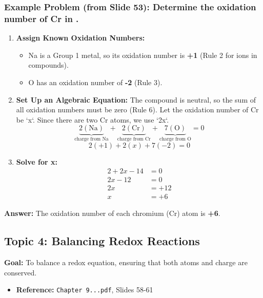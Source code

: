 \documentclass{article}
\begin{document}
\subsubsection*{Example Problem (from Slide 53): Determine the oxidation number of Cr in .}
\begin{enumerate}[label=\textbf{Step \arabic*:}, itemsep=5pt]
    \item \textbf{Assign Known Oxidation Numbers:}
    \begin{itemize}
        \item Na is a Group 1 metal, so its oxidation number is \textbf{+1} (Rule 2 for ions in compounds).
        \item O has an oxidation number of \textbf{-2} (Rule 3).
    \end{itemize}
    \item \textbf{Set Up an Algebraic Equation:} The compound is neutral, so the sum of all oxidation numbers must be zero (Rule 6). Let the oxidation number of Cr be `x`. Since there are two Cr atoms, we use `2x`.
    \[ \underbrace{2(\text{Na})}_{\text{charge from Na}} + \underbrace{2(\text{Cr})}_{\text{charge from Cr}} + \underbrace{7(\text{O})}_{\text{charge from O}} = 0 \]
    \[ 2(+1) + 2(x) + 7(-2) = 0 \]
    \item \textbf{Solve for x:}
    \begin{align*}
        2 + 2x - 14 &= 0 \\
        2x - 12 &= 0 \\
        2x &= +12 \\
        x &= +6
    \end{align*}
\end{enumerate}
\textbf{Answer:} The oxidation number of each chromium (Cr) atom is \textbf{+6}.

\subsection*{Topic 4: Balancing Redox Reactions}
\textbf{Goal:} To balance a redox equation, ensuring that both atoms and charge are conserved.
\begin{itemize}[itemsep=5pt]
    \item \textbf{Reference:} \texttt{Chapter 9...pdf}, Slides 58-61
\end{itemize}
\end{document}
